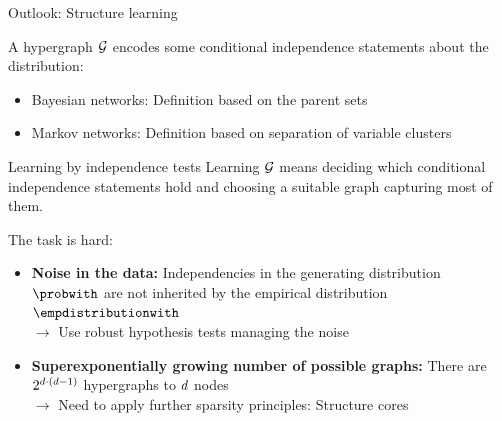 \documentclass{beamer}
\begin{document}
    \begin{frame}{Outlook: Structure learning}

        A hypergraph $\mathcal{G}$ encodes some conditional independence statements about the distribution:
        \begin{itemize}
            \item Bayesian networks: Definition based on the parent sets%
            \item Markov networks: Definition based on separation of variable clusters %
        \end{itemize}
        \begin{block}{Learning by independence tests}
            Learning $\mathcal{G}$ means deciding which conditional independence statements hold and choosing a suitable graph capturing most of them.
        \end{block}
        The task is hard:
        \begin{itemize}
            \item {\bf Noise in the data:} Independencies in the generating distribution $\probwith$ are not inherited by the empirical distribution $\empdistributionwith$ \\
            $\rightarrow$ Use robust hypothesis tests managing the noise
            \item {\bf Superexponentially growing number of possible graphs:} There are $2^{d\cdot(d-1)}$ hypergraphs to $d$ nodes \\
            $\rightarrow$ Need to apply further sparsity principles: Structure cores
        \end{itemize}


    \end{frame}
\end{document}
